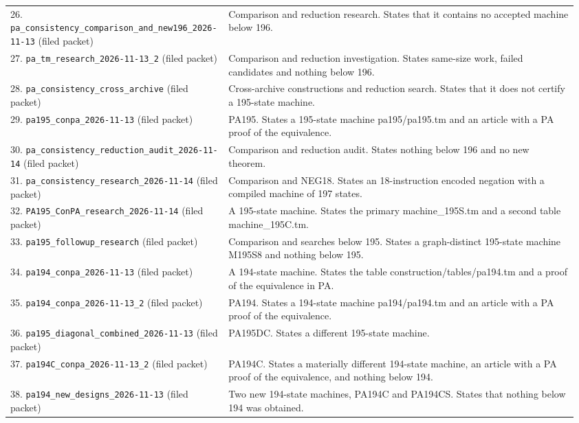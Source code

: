 \begin{longtable}{@{}p{0.35\linewidth}p{0.61\linewidth}@{}}
26. \nolinkurl{pa_consistency_comparison_and_new196_2026-11-13} (filed packet) & Comparison and reduction research. States that it contains no accepted machine below 196.\\[5pt]
27. \nolinkurl{pa_tm_research_2026-11-13_2} (filed packet) & Comparison and reduction investigation. States same-size work, failed candidates and nothing below 196.\\[5pt]
28. \nolinkurl{pa_consistency_cross_archive} (filed packet) & Cross-archive constructions and reduction search. States that it does not certify a 195-state machine.\\[5pt]
29. \nolinkurl{pa195_conpa_2026-11-13} (filed packet) & PA195. States a 195-state machine pa195/pa195.tm and an article with a PA proof of the equivalence.\\[5pt]
30. \nolinkurl{pa_consistency_reduction_audit_2026-11-14} (filed packet) & Comparison and reduction audit. States nothing below 196 and no new theorem.\\[5pt]
31. \nolinkurl{pa_consistency_research_2026-11-14} (filed packet) & Comparison and NEG18. States an 18-instruction encoded negation with a compiled machine of 197 states.\\[5pt]
32. \nolinkurl{PA195_ConPA_research_2026-11-14} (filed packet) & A 195-state machine. States the primary machine\_195S.tm and a second table machine\_195C.tm.\\[5pt]
33. \nolinkurl{pa195_followup_research} (filed packet) & Comparison and searches below 195. States a graph-distinct 195-state machine M195S8 and nothing below 195.\\[5pt]
34. \nolinkurl{pa194_conpa_2026-11-13} (filed packet) & A 194-state machine. States the table construction/tables/pa194.tm and a proof of the equivalence in PA.\\[5pt]
35. \nolinkurl{pa194_conpa_2026-11-13_2} (filed packet) & PA194. States a 194-state machine pa194/pa194.tm and an article with a PA proof of the equivalence.\\[5pt]
36. \nolinkurl{pa195_diagonal_combined_2026-11-13} (filed packet) & PA195DC. States a different 195-state machine.\\[5pt]
37. \nolinkurl{pa194C_conpa_2026-11-13_2} (filed packet) & PA194C. States a materially different 194-state machine, an article with a PA proof of the equivalence, and nothing below 194.\\[5pt]
38. \nolinkurl{pa194_new_designs_2026-11-13} (filed packet) & Two new 194-state machines, PA194C and PA194CS. States that nothing below 194 was obtained.\\[5pt]

\end{longtable}
